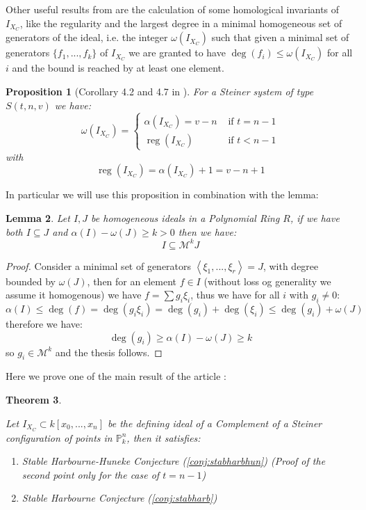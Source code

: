 \documentclass[notitlepage, a4]{book}
\theoremstyle{plain}
\newtheorem{teo}{Theorem}[section]
\newtheorem{lem}[teo]{Lemma}
\newtheorem{prop}[teo]{Proposition}
\theoremstyle{remark}
\theoremstyle{definition}
\newcommand{\PP}{\mathbb{P}}
\newcommand{\MM}{\mathcal{M}}
\DeclareMathOperator{\reg}{reg}
\begin{document}
Other useful results from \cite{Bal20Steiner} are the calculation of some homological invariants of $ I_{X_C}$, like the regularity and the largest degree in a minimal homogeneous set of generators of the ideal, i.e. the integer $ \omega (I_{X_	C}) $ such that given a minimal set of generators $\{ f_1 ,... , f_k\} $ of $ I_{X_	C} $ we are granted to have $ \deg (f_i) \leq \omega (I_{X_	C}) $ for all $ i $ and the bound is reached by at least one element. %

\begin{prop}[Corollary 4.2 and 4.7 in \cite{Bal20Steiner}]
\label{prop:largdeg}
For a Steiner system of type $ S(t,n,v) $ we have:
\begin{equation}\label{eq:largdeg}
\omega (I_{X_	C}) = 
\begin{cases}
\alpha (I_{X_	C})=v-n     & \text{ if } t = n-1\\
\reg(I_{X_C}) & \text{ if } t < n-1
\end{cases}
\end{equation}
with  \begin{equation}\label{eq:reqXC}
\reg(I_{X_C}) =\alpha (I_{X_	C})+1= v-n +1
\end{equation}
\end{prop}

In particular we will use this proposition in combination with the lemma:
\begin{lem}\label{lem:cont_om}
Let $ I,J $ be homogeneous ideals in a Polynomial Ring $ R $, if we have both $ I \subseteq J $ and $ \alpha(I) - \omega (J) \geq k >0 $ then we have:
\[ I \subseteq \MM^k J\]
\end{lem}
\begin{proof}
Consider a minimal set of generators $ \left\langle \xi_1 , ... ,\xi_r \right\rangle = J $, with degree bounded by $ \omega(J) $, then for an element $ f \in I $ (without loss og generality we assume it homogenous) we have $ f = \sum g_i \xi_i  $, thus we have for all $ i $ with $ g_i\neq 0 $:
\[ \alpha(I) \leq \deg (f) = \deg(g_i \xi_i ) = \deg(g_i) + \deg(\xi_i) \leq  \deg(g_i) + \omega(J) \]
therefore we have:
\[ \deg(g_i)  \geq\alpha(I) - \omega (J) \geq k \]
so $ g_i \in \MM^k $ and the thesis follows.
\end{proof}


Here we prove one of the main result of the article \cite{Bal21Steiner}:
\begin{teo}\label{teo:cont:csteiner}

Let $ I_{X_C} \subset k[x_0 , ... , x_n]$ be the defining ideal of a Complement of a Steiner configuration of points in $ \PP^n_k $, then it satisfies:
\begin{enumerate}
\item Stable Harbourne-Huneke Conjecture (\ref{conj:stabharbhun}) (Proof of the second point only for the case of $ t = n-1 $)
\item Stable Harbourne Conjecture (\ref{conj:stabharb})
\end{enumerate}
\end{teo}
\end{document}
